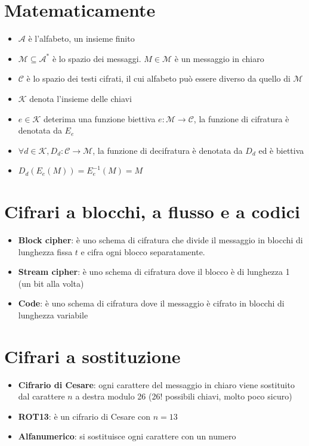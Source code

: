 \documentclass[12pt, a4paper]{report}
\begin{document}
\section{Matematicamente}
\begin{itemize}
    \item $\mathcal{A}$ è l'alfabeto, un insieme finito
    \item $\mathcal{M}\subseteq \mathcal{A}^{*}$ è lo spazio dei messaggi. $M\in \mathcal{M}$ è un messaggio in chiaro
    \item $\mathcal{C}$ è lo spazio dei testi cifrati, il cui alfabeto può essere diverso da quello di $\mathcal{M}$
    \item $\mathcal{K}$ denota l'insieme delle chiavi
    \item $e \in \mathcal{K}$ deterima una funzione biettiva $e: \mathcal{M} \rightarrow \mathcal{C}$, la funzione di cifratura è denotata da $E_{e}$
    \item $\forall d \in \mathcal{K}, D_{d}: \mathcal{C} \rightarrow \mathcal{M}$, la funzione di decifratura è denotata da $D_{d}$ ed è biettiva
    \item $D_{d}(E_{e}(M)) = E^{-1}_{e}(M) = M$
\end{itemize}
\section{Cifrari a blocchi, a flusso e a codici}
\begin{itemize}
    \item \textbf{Block cipher}: è uno schema di cifratura che divide il messaggio in blocchi di lunghezza fissa $t$ e cifra ogni blocco separatamente.
    \item \textbf{Stream cipher}: è uno schema di cifratura dove il blocco è di lunghezza 1 (un bit alla volta)
    \item \textbf{Code}: è uno schema di cifratura dove il messaggio è cifrato in blocchi di lunghezza variabile
\end{itemize}
\section{Cifrari a sostituzione}
\begin{itemize}
    \item \textbf{Cifrario di Cesare}: ogni carattere del messaggio in chiaro viene sostituito dal carattere $n$ a destra modulo 26 (26! possibili chiavi, molto poco sicuro)
    \item \textbf{ROT13}: è un cifrario di Cesare con $n=13$
    \item \textbf{Alfanumerico}: si sostituisce ogni carattere con un numero
\end{itemize}
\end{document}
